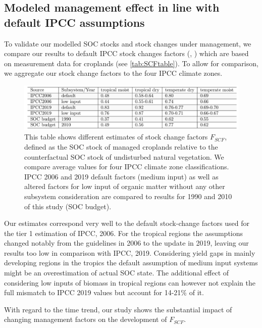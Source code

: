 \documentclass[gc, manuscript]{copernicus}
\begin{document}
\hypertarget{modeled-management-effect-in-line-with-default-ipcc-assumptions}{%
\subsection{Modeled management effect in line with default IPCC assumptions}\label{modeled-management-effect-in-line-with-default-ipcc-assumptions}}

To validate our modelled SOC stocks and stock changes under management, we compare our results to default IPCC stock changes factors (\citet{ipcc_2006_2006}, \citet{ipcc_2019_2019}) which are based on measurement data for croplands (see \ref{tab:SCFtable}). To allow for comparison, we aggregate our stock change factors to the four IPCC climate zones.

\begin{figure}
\includegraphics[width=16cm]{../ResultNotebooks/Output/Images/TableSCF_comparison} \caption{This table shows different estimates of stock change factors $F_{SCF}$, defined as the SOC stock of managed croplands relative to the counterfactual SOC stock of undisturbed natural vegetation. We compare average values for four IPCC climate zone classifications. IPCC 2006 and 2019 default factors (medium input) as well as altered factors for low input of organic matter without any other subsystem consideration are compared to results for 1990 and 2010 of this study (SOC budget).}\label{fig:SCFtable}
\end{figure}

Our estimates correspond very well to the default stock-change factors used for the tier 1 estimation of IPCC, 2006. For the tropical regions the assumptions changed notably from the guidelines in 2006 to the update in 2019, leaving our results too low in comparison with IPCC, 2019. Considering yield gaps in mainly developing regions in the tropics the default assumption of medium input systems might be an overestimation of actual SOC state. The additional effect of considering low inputs of biomass in tropical regions can however not explain the full mismatch to IPCC 2019 values but account for 14-21\% of it.

With regard to the time trend, our study shows the substantial impact of changing management factors on the development of \(F_{SCF}\).
\end{document}
